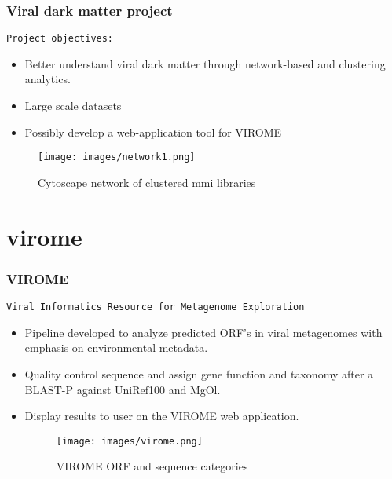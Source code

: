 \documentclass{beamer}
\begin{document}
\begin{frame}[fragile]
\frametitle{Viral dark matter project}
\texttt{Project objectives: }

\begin{itemize}
\item Better understand viral dark matter through network-based and clustering analytics.
\item Large scale datasets
\item Possibly develop a web-application tool for VIROME
\end{itemize}


\begin{figure}
\centering
\texttt{[image: images/network1.png]}\\[-1ex]
\caption{Cytoscape network of clustered mmi libraries}
\label{fig:3}
\end{figure}

\end{frame}

\section{virome}
\begin{frame}[fragile]
\frametitle{VIROME}
\texttt{Viral Informatics Resource for Metagenome Exploration}

\begin{itemize}
\item Pipeline developed to analyze predicted ORF's in viral metagenomes with emphasis on environmental metadata.
\item Quality control sequence and assign gene function and taxonomy after a BLAST-P against UniRef100 and MgOl.
\item Display results to user on the VIROME web application.

\begin{figure}
\centering
\texttt{[image: images/virome.png]}\\[-1ex]
\caption{VIROME ORF and sequence categories}
\label{fig:3}
\end{figure}

\end{itemize}

\end{frame}
\end{document}
